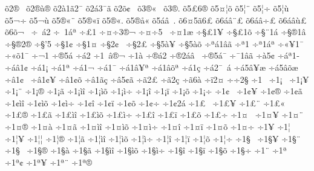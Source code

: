 {^^f52^^ae^^ad^^a0
^^f52^^ae^^e0^^ae
^^f52^^e01^^e32^^af
^^f52^^e13^^af^^e3
^^f52^^f5^^a2^^a0
^^f53^^ae^^ab^^a0
^^f53^^ae^^ad.
^^f55^^a36^^ad^^ae
^^f55^^a4^^a6^^f5
^^f55^^a6^^a8
^^f55^^a6^^f7
^^f55^^a6^^f9
^^f55^^ac^^f7
^^f55^^ac^^f9
^^f55^^ae^^ab^^a8
^^f55^^ae^^ab^^ef
^^f55^^ae^^ab.
^^f55^^ae^^e5^^ab
^^f55^^e1^^e2^^a0.
^^f56^^a45^^e36^^a3
^^f56^^e1^^e2^^a8^^a3
^^f56^^e1^^e2^^f7^^a3
^^f56^^e1^^e2^^f9^^a3
^^f56^^f5^^ac^^a0
^^f7^^a0^^e12
^^f7^^a01^^e1^^aa
^^f7^^a31^^ad
^^f7^^a4^^f73^^ae^^ac
^^f7^^a4^^f75^^a0
^^f7^^a41^^e6
^^f7^^a7^^a31^^ad^^a5
^^f7^^a7^^a31^^ad^^f5
^^f7^^a7^^a81^^e1
^^f7^^a7^^ae1^^e2
^^f7^^a7^^ae2^^ae
^^f7^^a7'5
^^f7^^a71^^a2
^^f7^^a71^^a4
^^f7^^a72^^a2^^a0
^^f7^^a72^^a3^^ad
^^f7^^a75^^e0^^a5
^^f7^^a75^^e0^^f5
^^f7^^aa^^e11^^e2^^e3
^^f7^^aa1^^ad
^^f7^^aa1^^e1^^aa
^^f7^^ab^^a51^^af
^^f7^^ab^^f51^^af
^^f7^^ac1^^ad
^^f7^^ad^^ae5^^e1
^^f7^^ad^^e12
^^f7^^ad1^^a0^^e2^^ae^^ac
^^f7^^ad1^^e0
^^f7^^ae^^e12
^^f7^^ae2^^e1^^e2^^a0
^^f7^^ae5^^e1^^af
^^f7^^af1^^e2^^e3
^^f7^^e05^^a2
^^f7^^e1^^aa1^^ad
^^f7^^e1^^e21^^a2
^^f7^^e11^^a1
^^f7^^e11^^aa
^^f7^^e11^^ac
^^f7^^e11^^af
^^f7^^e11^^e2^^a5^^aa
^^f7^^e11^^e2^^f5^^aa
^^f7^^e11^^e7
^^f7^^e12^^af^^a0^^e1
^^f7^^e15^^e2^^a5^^e6
^^f7^^e15^^e2^^f5^^e6
^^f7^^e21^^a2^^a0
^^f7^^e21^^a2^^a5
^^f7^^e21^^a2^^f5
^^f7^^e21^^e3^^e7
^^f7^^e25^^a2^^e3
^^f7^^e32^^a3
^^f7^^e32^^e7
^^f7^^e36^^e0
^^f7^^ef2^^a4
^^f7^^f72^^a7
^^f71^^a0
^^f71^^a1^^a0
^^f71^^a1^^a5
^^f71^^a1^^a8
^^f71^^a1^^ae
^^f71^^a1^^e3
^^f71^^a1^^ec^^ee
^^f71^^a1^^ec^^f5
^^f71^^a1^^ec^^f7
^^f71^^a1^^ee
^^f71^^a1^^ef
^^f71^^a1^^f5
^^f71^^a1^^f7
^^f71^^a2^^a0
^^f71^^a2^^a5
^^f71^^a2^^ae
^^f71^^a2^^e3
^^f71^^a2^^ec^^ee
^^f71^^a2^^ec^^f5
^^f71^^a2^^ec^^f7
^^f71^^a2^^ee
^^f71^^a2^^ef
^^f71^^a2^^f5
^^f71^^a2^^f7
^^f71^^a22^^e1
^^f71^^a3^^a0
^^f71^^a3^^a5
^^f71^^a3^^a8
^^f71^^a3^^ab
^^f71^^a3^^ae
^^f71^^a3^^e3
^^f71^^a3^^ec^^ee
^^f71^^a3^^ec^^f5
^^f71^^a3^^ec^^f7
^^f71^^a3^^ee
^^f71^^a3^^ef
^^f71^^a3^^f5
^^f71^^a3^^f7
^^f71^^a4^^a0
^^f71^^a4^^a5
^^f71^^a4^^a8
^^f71^^a4^^ae
^^f71^^a4^^e0
^^f71^^a4^^e3
^^f71^^a4^^ec^^ee
^^f71^^a4^^ec^^f5
^^f71^^a4^^ec^^f7
^^f71^^a4^^ee
^^f71^^a4^^ef
^^f71^^a4^^f5
^^f71^^a4^^f7
^^f71^^a5
^^f71^^a6^^a0
^^f71^^a6^^a5
^^f71^^a6^^a6
^^f71^^a6^^ae
^^f71^^a6^^e3
^^f71^^a6^^ec^^ee
^^f71^^a6^^ec^^f5
^^f71^^a6^^ec^^f7
^^f71^^a6^^ee
^^f71^^a6^^ef
^^f71^^a6^^f5
^^f71^^a6^^f7
^^f71^^a7^^a0
^^f71^^a7^^a5
^^f71^^a7^^a8
^^f71^^a7^^ad^^a0
^^f71^^a7^^ae
^^f71^^a7^^e0
^^f71^^a7^^e3
^^f71^^a7^^ec^^ee
^^f71^^a7^^ec^^f5
^^f71^^a7^^ec^^f7
^^f71^^a7^^ee
^^f71^^a7^^ef
^^f71^^a7^^f5
^^f71^^a7^^f7
^^f71^^a8
^^f71^^aa^^a0
^^f71^^aa^^a2
^^f71^^aa^^a5
^^f71^^aa^^a8
^^f71^^aa^^ae
}
